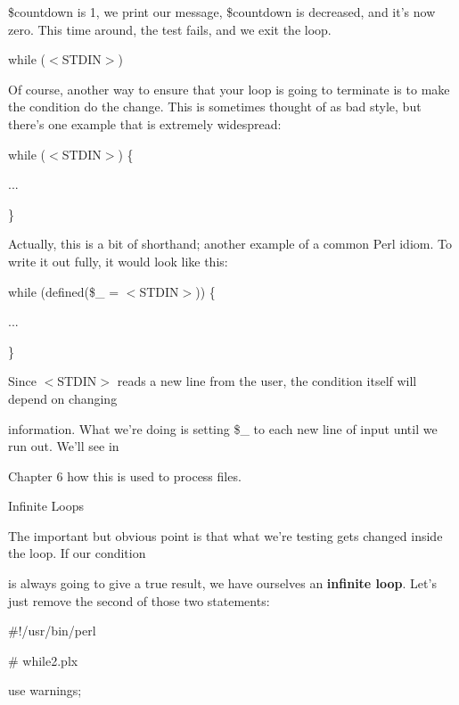 \documentclass[a4paper,11pt]{book}
\begin{document}
\noindent \$countdown is  1,  we  print  our  message,  \$countdown is  decreased,  and  it's  now  zero.  This  time around, the test fails, and we exit the loop.

\noindent 

\noindent while ($<$STDIN$>$)

\noindent 

\noindent Of course, another way to ensure that your loop is going to terminate is to make the condition do the change. This is sometimes thought of as bad style, but there's one example that is extremely widespread:

\noindent 

\noindent while ($<$STDIN$>$) \{

\noindent ...

\noindent \}

\noindent 

\noindent Actually, this is a bit of shorthand; another example of a common Perl idiom. To write it out fully, it would look like this:

\noindent 

\noindent while (defined(\$\_  = $<$STDIN$>$)) \{

\noindent ...

\noindent \}

\noindent 

\noindent 

\noindent Since $<$STDIN$>$ reads a new line from the user, the condition itself will depend on changing

\noindent information. What we're doing is setting \$\_ to each new line of input until we run out. We'll see in

\noindent Chapter 6 how this is used to process files.

\noindent 

\noindent Infinite Loops

\noindent 

\noindent The important but obvious point is that what we're testing gets changed inside the loop. If our condition

\noindent is always going to give a true result, we have ourselves an \textbf{infinite loop}. Let's just remove the second of those two statements:

\noindent 

\noindent \#!/usr/bin/perl

\noindent \# while2.plx

\noindent use warnings;
\end{document}
